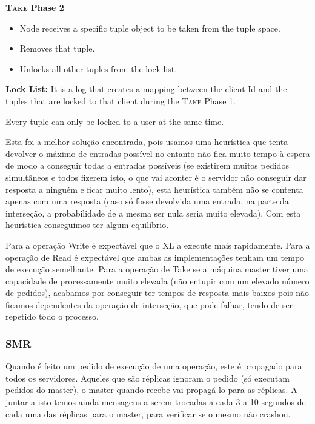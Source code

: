 \documentclass[times, 10pt,twocolumn]{article}
\begin{document}
\textbf{\textsc{Take} Phase 2}
\begin{itemize}
   \item Node receives a specific tuple object to be taken from the tuple space.
   \item Removes that tuple.
   \item Unlocks all other tuples from the lock list.
\end{itemize}

\textbf{Lock List:} It is a log that creates a mapping between the client Id and the
tuples that are locked to that client during the \textsc{Take} Phase 1.

Every tuple can only be locked to a user at the same time.

Esta foi a melhor solução encontrada, pois usamos uma heurística que tenta devolver o máximo de entradas
possível no entanto não fica muito tempo à espera de modo a conseguir todas a entradas possíveis (se existirem
muitos pedidos simultâneos e todos fizerem isto, o que vai aconter é o servidor não conseguir dar resposta a ninguém
e ficar muito lento), esta heurística também não se contenta apenas com uma resposta (caso só fosse devolvida uma entrada,
na parte da interseção, a probabilidade de a mesma ser nula seria muito elevada). Com esta heurística conseguimos
ter algum equilíbrio.



Para a operação Write é expectável que o XL a execute mais rapidamente.
Para a operação de Read é expectável que ambas as implementações tenham um tempo de execução semelhante.
Para a operação de Take se a máquina master tiver uma capacidade de processamente muito elevada (não entupir com
um elevado número de pedidos), acabamos por conseguir ter tempos de resposta mais baixos pois não ficamos dependentes
da operação de interseção, que pode falhar, tendo de ser repetido todo o processo.

\subsubsection{SMR}

Quando é feito um pedido de execução de uma operação, este é propagado para todos os servidores. Aqueles que são réplicas
ignoram o pedido (só executam pedidos do master), o master quando recebe vai propagá-lo para as réplicas. A juntar a isto 
temos ainda mensagens a serem trocadas a cada 3 a 10 segundos de cada uma das réplicas para o master, para verificar se o mesmo
não crashou.
 
\end{document}
